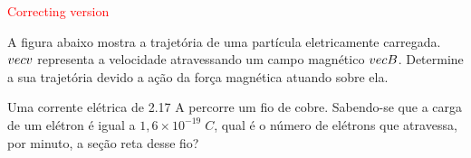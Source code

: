 \documentclass[12pt, addpoints]{exam}
\begin{document}
        \begin{center}
\textcolor{red}{\emph\Large Correcting version}\end{center}
\begin{questions}
\begin{multicols*}{2}
\question[20] A ﬁgura abaixo mostra a trajetória de uma partícula eletricamente carregada. $\\vec{{v}}$ representa a velocidade atravessando um campo magnético $\\vec{{B}}$. Determine a sua trajetória devido a ação da força magnética atuando sobre ela.
        
        \begin{center}
            \begin{minipage}[c]{0.5\linewidth}
            \end{minipage}
        \end{center}

        

\begin{oneparchoices}
\end{oneparchoices}
\question[20] Uma corrente elétrica de    2.17 A percorre um ﬁo de cobre. Sabendo-se que a carga de um elétron é igual a $1,6\times 10^{-19}\;C$, qual é o número de elétrons que atravessa, por minuto, a seção reta desse ﬁo?


\end{multicols*}
\end{questions}
\end{document}
